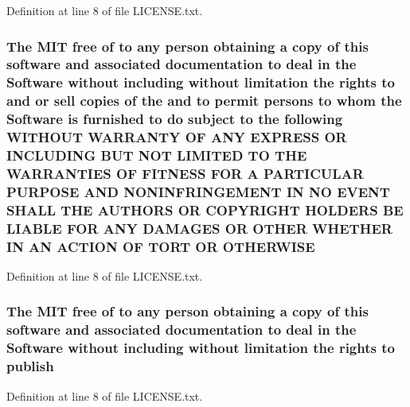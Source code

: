 Definition at line 8 of file L\+I\+C\+E\+N\+S\+E.\+txt.

\subsubsection[{\texorpdfstring{O\+T\+H\+E\+R\+W\+I\+SE}{OTHERWISE}}]{\setlength{\rightskip}{0pt plus 5cm}The M\+IT free of to any person obtaining a {\bf copy} of this software and associated documentation to deal in the {\bf Software} without including without limitation the rights to and or sell copies of the and to permit persons to whom the {\bf Software} is furnished to do subject to the following W\+I\+T\+H\+O\+UT W\+A\+R\+R\+A\+N\+TY OF A\+NY E\+X\+P\+R\+E\+SS OR I\+N\+C\+L\+U\+D\+I\+NG B\+UT N\+OT L\+I\+M\+I\+T\+ED TO T\+HE W\+A\+R\+R\+A\+N\+T\+I\+ES OF F\+I\+T\+N\+E\+SS F\+OR A P\+A\+R\+T\+I\+C\+U\+L\+AR P\+U\+R\+P\+O\+SE A\+ND N\+O\+N\+I\+N\+F\+R\+I\+N\+G\+E\+M\+E\+NT IN NO E\+V\+E\+NT S\+H\+A\+LL T\+HE A\+U\+T\+H\+O\+RS OR C\+O\+P\+Y\+R\+I\+G\+HT H\+O\+L\+D\+E\+RS BE L\+I\+A\+B\+LE F\+OR A\+NY D\+A\+M\+A\+G\+ES OR O\+T\+H\+ER W\+H\+E\+T\+H\+ER IN AN A\+C\+T\+I\+ON OF T\+O\+RT OR O\+T\+H\+E\+R\+W\+I\+SE}\hypertarget{LICENSE_8txt_ae4c7c54aef6c135b4520f2237dbcf7c6}{}\label{LICENSE_8txt_ae4c7c54aef6c135b4520f2237dbcf7c6}


Definition at line 8 of file L\+I\+C\+E\+N\+S\+E.\+txt.

\subsubsection[{\texorpdfstring{publish}{publish}}]{\setlength{\rightskip}{0pt plus 5cm}The M\+IT free of to any person obtaining a {\bf copy} of this software and associated documentation to deal in the {\bf Software} without including without limitation the rights to publish}\hypertarget{LICENSE_8txt_ae6b6c4d3ae1a4140d31294e27bb0ebd8}{}\label{LICENSE_8txt_ae6b6c4d3ae1a4140d31294e27bb0ebd8}


Definition at line 8 of file L\+I\+C\+E\+N\+S\+E.\+txt.

